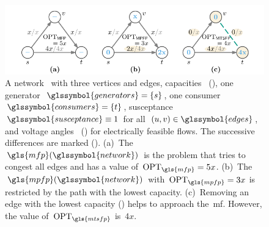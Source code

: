\begin{figure}[t!]%
    \centering\includegraphics{switchplacement/figures/simple_switching_example_comparing_mf_mpf_mtsf.pdf}
    \caption[A simple switching example that compares~\gls{mf}, 
    \gls{mpf}, and~\gls{mtsf}.]{%
    A network~ with three vertices and edges,
    capacities~
    \mbox{()}, one generator~$
    \glssymbol{generators}=\{\source\}$, one consumer~$\glssymbol{consumers} = 
    \{\sink\}$,
    susceptance~$\glssymbol{susceptance} \equiv 1$ for
    all~$(\vertexa,\vertexb)\in\glssymbol{edges}$, and voltage
    angles~ () for
    electrically feasible flows. The successive differences are marked
    (). (a)~The~$\gls{mfp}(\glssymbol{network})$ is the problem
    that tries to congest all edges and has a value of~$\opt_{\gls{mfp}} = 5x$.
    (b)~The~$\gls{mpfp}(\glssymbol{network})$ with~$\opt_{\gls{mpfp}} = 3x$ is
    restricted by the path with the lowest capacity. (c)~Removing an edge with
    the lowest capacity () helps to
    approach the~\gls{mf}. However, the value of~$\opt_{\gls{mtsfp}}$ is~$4x$. }%
    \label{ch:switching:sec:model:fig:simple_switching_example}%
\end{figure}%
%

